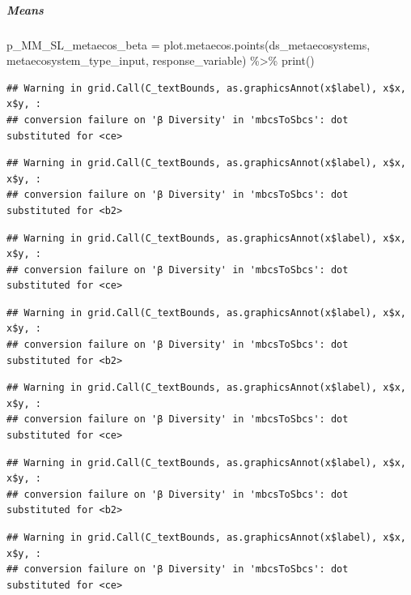 \documentclass[
]{article}
\newenvironment{Shaded}{\begin{snugshade}}{\end{snugshade}}
\newcommand{\FunctionTok}[1]{\textcolor[rgb]{0.00,0.00,0.00}{#1}}
\newcommand{\NormalTok}[1]{#1}
\newcommand{\OtherTok}[1]{\textcolor[rgb]{0.56,0.35,0.01}{#1}}
\newcommand{\SpecialCharTok}[1]{\textcolor[rgb]{0.00,0.00,0.00}{#1}}
\begin{document}
\hypertarget{means-6}{%
\subparagraph{Means}\label{means-6}}

\begin{Shaded}
\begin{Highlighting}[]
\NormalTok{p\_MM\_SL\_metaecos\_beta }\OtherTok{=} \FunctionTok{plot.metaecos.points}\NormalTok{(ds\_metaecosystems, }
\NormalTok{                                             metaecosystem\_type\_input,}
\NormalTok{                                             response\_variable) }\SpecialCharTok{\%\textgreater{}\%}
  \FunctionTok{print}\NormalTok{()}
\end{Highlighting}
\end{Shaded}

\begin{verbatim}
## Warning in grid.Call(C_textBounds, as.graphicsAnnot(x$label), x$x, x$y, :
## conversion failure on 'β Diversity' in 'mbcsToSbcs': dot substituted for <ce>
\end{verbatim}

\begin{verbatim}
## Warning in grid.Call(C_textBounds, as.graphicsAnnot(x$label), x$x, x$y, :
## conversion failure on 'β Diversity' in 'mbcsToSbcs': dot substituted for <b2>
\end{verbatim}

\begin{verbatim}
## Warning in grid.Call(C_textBounds, as.graphicsAnnot(x$label), x$x, x$y, :
## conversion failure on 'β Diversity' in 'mbcsToSbcs': dot substituted for <ce>
\end{verbatim}

\begin{verbatim}
## Warning in grid.Call(C_textBounds, as.graphicsAnnot(x$label), x$x, x$y, :
## conversion failure on 'β Diversity' in 'mbcsToSbcs': dot substituted for <b2>
\end{verbatim}

\begin{verbatim}
## Warning in grid.Call(C_textBounds, as.graphicsAnnot(x$label), x$x, x$y, :
## conversion failure on 'β Diversity' in 'mbcsToSbcs': dot substituted for <ce>
\end{verbatim}

\begin{verbatim}
## Warning in grid.Call(C_textBounds, as.graphicsAnnot(x$label), x$x, x$y, :
## conversion failure on 'β Diversity' in 'mbcsToSbcs': dot substituted for <b2>
\end{verbatim}

\begin{verbatim}
## Warning in grid.Call(C_textBounds, as.graphicsAnnot(x$label), x$x, x$y, :
## conversion failure on 'β Diversity' in 'mbcsToSbcs': dot substituted for <ce>
\end{verbatim}
\end{document}
